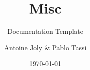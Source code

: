 \documentclass[Misc]{../../data/TelemacDoc} %
\begin{document}
\let\cleardoublepage\clearpage

\title{Misc}
\subtitle{Documentation Template}
\author{Antoine Joly \& Pablo Tassi}
\date{\today}
\maketitle
\clearpage



\newpage

\thispagestyle{empty}

\TelemacCopyright{}




\pagestyle{empty} %

\tableofcontents%


\pagestyle{fancy} %












\end{document}
